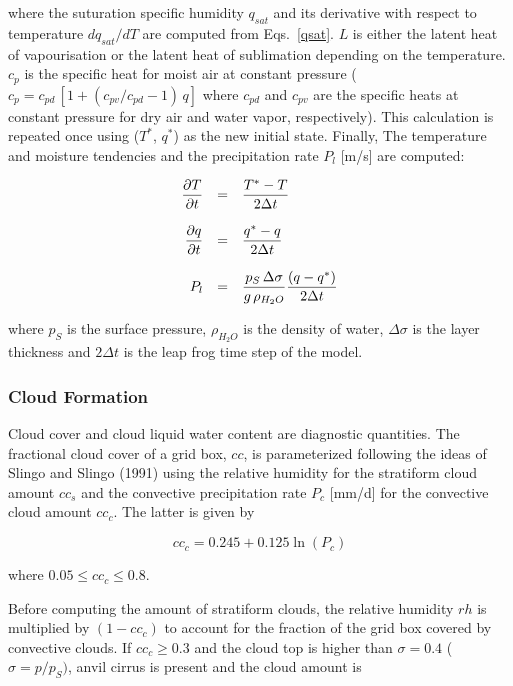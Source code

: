 where the suturation specific humidity $q_{sat}$  and
its derivative with respect to temperature 
$dq_{sat}/dT$ are computed from Eqs.~\ref{qsat}.
$L$ is
either the latent heat of vapourisation or
the latent heat of  sublimation depending on the
temperature.
$c_p$ is the specific
heat for moist air at constant pressure ($c_p= c_{pd} \,
[1+(c_{pv}/c_{pd}-1)\, q]$ where
$c_{pd}$ and $c_{pv}$ are the specific heats at
constant pressure for dry air and water vapor,
respectively). This calculation is repeated once using
($T^*$,
$q^*$) as the new initial state. Finally, The
temperature
and moisture tendencies and the precipitation rate
$P_{l}$  [m/s] are computed:

\begin{equation}
\begin{array}{rcl}
\displaystyle \frac{\partial T}{\partial t} & = &
\displaystyle \frac{T^*-T}{2\Delta t} \\
&&\\ 
\displaystyle \frac{\partial q}{\partial t} & = &
\displaystyle \frac{q^*-q}{2\Delta  t} \\
&& \\
\displaystyle P_{l} & =  & \displaystyle  \frac{p_S \, \Delta \sigma}{g \,
{\rho}_{H_2O}} \frac{ (q-q^*)}{2\Delta t}
\end{array}
\end{equation}

where $p_S$ is the surface pressure, $\rho_{H_2O}$
is
the density of water, $\Delta \sigma$ is the layer
thickness and $2\Delta t$ is the leap frog time step of
the model.

\subsubsection{Cloud Formation}
Cloud cover and cloud liquid water content are
diagnostic quantities. The fractional cloud cover
of a grid box, $cc$, is parameterized following the ideas of Slingo and Slingo (1991) using the
relative humidity for the stratiform cloud amount $cc_s$ and the convective precipitation rate
$P_{c}$ [mm/d] for the convective cloud amount $cc_c$. The latter is given by

\begin{equation}
cc_c= 0.245 + 0.125 \ln{(P_c)}
\end{equation}

where $0.05 \le cc_c \le 0.8$.

Before computing the amount of stratiform clouds, the relative humidity $rh$ is multiplied by
$(1-cc_c)$ to account for the fraction of the grid box covered by convective clouds. If $cc_c \ge
0.3$ and the cloud top is higher than $\sigma = 0.4$ ($\sigma=p/p_S)$, anvil cirrus is present
and the cloud amount is   

